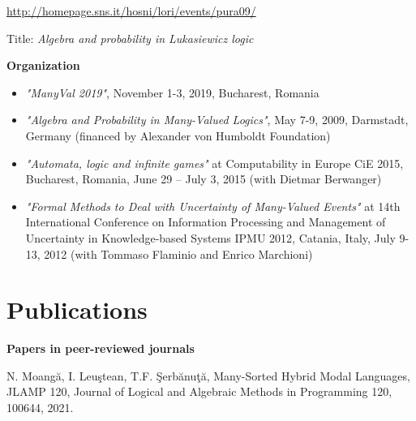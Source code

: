 \documentclass[11pt]{article}
\begin{document}
 \url{http://homepage.sns.it/hosni/lori/events/pura09/}


Title: {\em Algebra and probability in Lukasiewicz logic}



\vspace{0.3cm}
\noindent
{\large \textbf{Organization}}
\medskip

\begin{itemize}
\vspace{-.3cm}
\item {\em "ManyVal 2019"}, November 1-3, 2019, Bucharest, Romania
            

\vspace{-.3cm}            
\item {\em "Algebra and Probability in Many-Valued Logics"}, May 7-9, 2009, Darmstadt, Germany 
            (financed by Alexander von Humboldt Foundation) 
\end{itemize}
\vspace{.2cm}            
\begin{itemize}
\vspace{-.3cm}
\item  {\em "Automata, logic and infinite games"} at Computability in Europe  CiE 2015,             	   	Bucharest, Romania,  June 29 – July 3, 2015 (with Dietmar Berwanger)

\vspace{-.3cm}
\item {\em "Formal Methods to Deal with Uncertainty of Many-Valued Events"} at 14th  International Conference on Information  Processing and Management of Uncertainty in Knowledge-based Systems  IPMU 2012, Catania, Italy, July 9-13, 2012 (with Tommaso Flaminio and Enrico Marchioni)
\end{itemize}

\section*{Publications}


\vspace{0.3cm}

\noindent
{\large \textbf{Papers in peer-reviewed journals}}

\noindent 
[J31] N.  Moangă, I. Leu\c stean, T.F. Şerbănuţă, Many-Sorted Hybrid Modal Languages, JLAMP 120,  Journal of Logical and Algebraic Methods in Programming 120, 100644, 2021.
\end{document}
